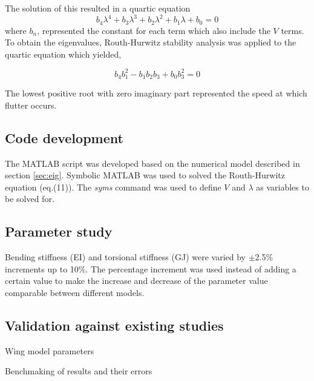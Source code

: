 \documentclass[11pt]{article}
\begin{document}
The solution of this resulted in a quartic equation\\
\begin{equation}\label{eq:b_n}
    b_4\lambda^4+b_3\lambda^3+b_2\lambda^2+b_1\lambda+b_0 = 0
\end{equation}
where $b_n$, represented the constant for each term which also include the $V$ terms.\\

To obtain the eigenvalues, Routh-Hurwitz stability analysis was applied to the quartic equation which yielded,

\begin{equation}
    b_4b_1^2-b_1b_2b_3+b_0b_3^2 = 0
\end{equation}

The lowest positive root with zero imaginary part represented the speed at which flutter occurs.

\subsection{Code development}
The MATLAB script was developed based on the numerical model described in section \ref{sec:eig}. Symbolic MATLAB was used to solved the Routh-Hurwitz equation (eq.(11)). The \textit{syms} command was used to define $V$ and $\lambda$ as variables to be solved for.        

\subsection{Parameter study}
Bending stiffness (EI) and torsional stiffness (GJ) were varied by $\pm$2.5\% increments up to 10\%. The percentage increment was used instead of adding a certain value to make the increase and decrease of the parameter value comparable between different models. 

\subsection{Validation against existing studies}
\begin{table}[H]
    \centering
    \caption{Wing model parameters}
    
    \label{tab:data}
\end{table}

\begin{table}[H]
    \centering
    \caption{Benchmaking of results and their errors}
    
    \label{tab:error}
\end{table}
\end{document}
